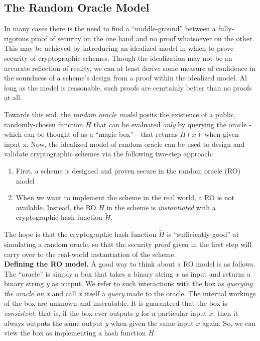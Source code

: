 \subsection{The Random Oracle Model}
In many cases there is the need to find a ``middle-ground'' between a fully-rigorous proof of security on the one hand and no proof whatsoever on the other. This may be achieved by introducing an idealized model in which to prove security of cryptographic schemes. Though the idealization may not be an accurate reflection of reality, we can at least derive some measure of confidence in the soundness of a scheme's design from a proof within the idealized model. Al long as the model is reasonable, such proofs are cenrtainly better than no proofs at all. 

Towards this end, the \emph{random oracle model} posits the existence of a public, randomly-chosen function $H$ that can be evaluated \emph{only} by querying the oracle - which can be thought of as a ``magic box'' - that returns $H(x)$ when given input x. Now, the idealized model of random oracle can be used to design and validate cryptographic schemes via the following two-step approach:
\begin{enumerate}
	\item First, a scheme is designed and proven secure in the random oracle (RO) model 
	\item When we want to implement the scheme in the real world, a RO is not available. Instead, the RO $H$ in the scheme is \emph{instantiated} with a cryptographic hash function $\tilde{H}$.  
\end{enumerate}
The hope is that the cryptographic hash function $\tilde{H}$ is ``sufficiently good'' at simulating a random oracle, so that the security proof given in the first step will carry over to the real-world instantiation of the scheme.\\

\noindent
\textbf{Defining the RO model.}
A good way to think about a RO model is as follows. The ``oracle'' is simply a box that takes a binary string $x$ as input and returns a binary string $y$ as output. We refer to such interactions with the box as \emph{querying the oracle on x} and call $x$ itself a \emph{query} made to the oracle. The internal workings of the box are unknown and inscrutable. It is guaranteed that the box is \emph{consistent}: that is, if the box ever outputs $y$ for a particular input $x$, then it always outputs the same output $y$ when given the same input $x$ again. So, we can view the box as implementing a hash function $H$.


